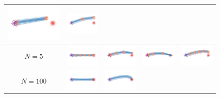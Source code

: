 \begin{figure}[h]
{\begin{tabular}{c|c|c|c|c}
        \includegraphics[width=.2\textwidth, trim={0cm 3cm 0 \trimlen},clip]{arxiv_figures/gg_sub_vpsde_2steps.png} & 
    \includegraphics[width=.2\textwidth, trim={0cm 3cm 0 \trimlen},clip]{arxiv_figures/gg_linear_prev_2steps.png}  \\ \hline 
\small  $N=5$ &     
    \includegraphics[width=.2\textwidth, trim={0cm 3cm 0 3cm},clip]{arxiv_figures/gg_linear_5steps.png} & 
    \includegraphics[width=.2\textwidth, trim={0cm 3cm 0 \trimlen},clip]{arxiv_figures/gg_vpsde_5steps.png} &     
    \includegraphics[width=.2\textwidth, trim={0cm 3cm 0 \trimlen},clip]{arxiv_figures/gg_sub_vpsde_5steps.png} &     
    \includegraphics[width=.2\textwidth, trim={0cm 3cm 0 \trimlen},clip]{arxiv_figures/gg_linear_prev_5steps.png}  \\   \hline   
\small  $N=100$ &    
    \includegraphics[width=.2\textwidth, trim={0cm 3cm 0 3cm},clip]{arxiv_figures/gg_linear_100steps.png} & 
    \includegraphics[width=.2\textwidth, trim={0cm 3cm 0 \trimlen},clip]{arxiv_figures/gg_vpsde_100steps.png} & 

\end{tabular}}
\end{figure}
